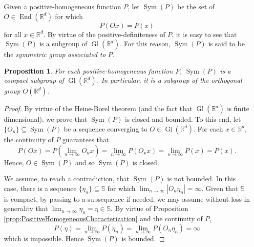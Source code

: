\documentclass[11pt]{article}
\newtheorem{proposition}[theorem]{Proposition}
\newcommand\End{\operatorname{End}} %
\newcommand\Gl{\operatorname{Gl}}                     %
\newcommand\Sym{\operatorname{Sym}}
\begin{document}
\noindent Given a positive-homogeneous function $P$, let $\Sym(P)$ be the set of $O\in\End(\mathbb{R}^d)$ for which
\begin{equation*}
P(Ox)=P(x)
\end{equation*}
for all $x\in\mathbb{R}^d$. By virtue of the positive-definiteness of $P$, it is easy to see that $\Sym(P)$ is a subgroup of $\Gl(\mathbb{R}^d)$. For this reason, $\Sym(P)$ is said to be the \textit{symmetric group associated to $P$}. 

\begin{proposition}\label{prop:SymCompact}
For each positive-homogeneous function $P$, $\Sym(P)$ is a compact subgroup of $\Gl(\mathbb{R}^d)$. In particular, it is a subgroup of the orthogonal group $O(\mathbb{R}^d)$.
\end{proposition}
\begin{proof}
By virtue of the Heine-Borel theorem (and the fact that $\Gl(\mathbb{R}^d)$ is finite dimensional), we prove that $\Sym(P)$ is closed and bounded. To this end, let $\{O_n\}\subseteq\Sym(P)$ be a sequence converging to $O\in \Gl(\mathbb{R}^d)$. For each $x\in\mathbb{R}^d$, the continuity of $P$ guarantees that
\begin{equation*}
P(Ox)=P\left(\lim_{n\to\infty}O_nx\right)=\lim_{n\to\infty}P(O_nx)=\lim_{n\to\infty}P(x)=P(x).
\end{equation*}
Hence, $O\in\Sym(P)$ and so $\Sym(P)$ is closed.

We assume, to reach a contradiction, that $\Sym(P)$ is not bounded. In this case, there is a sequence $\{\eta_n\}\subseteq \mathbb{S}$ for which $\lim_{n\to\infty}|O_n\eta_n|=\infty$. Given that $\mathbb{S}$ is compact, by passing to a subsequence if needed, we may assume without loss in generality that $\lim_{n\to\infty}\eta_n=\eta\in\mathbb{S}$. By virtue of Proposition \ref{prop:PositiveHomogeneousCharacterization} and the continuity of $P$,
\begin{equation*}
P(\eta)=\lim_{n\to\infty}P(\eta_n)=\lim_{n\to\infty}P(O_n\eta_n)=\infty
\end{equation*}
which is impossible. Hence $\Sym(P)$ is bounded.
\end{proof}
\end{document}
